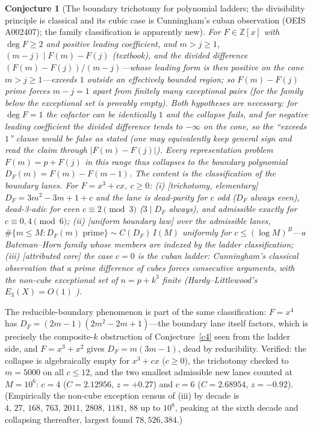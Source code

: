 \documentclass[11pt]{article}
\newtheorem{conjecture}{Conjecture}
\theoremstyle{definition}
\begin{document}
\setcounter{conjecture}{21}%
\begin{conjecture}[The boundary trichotomy for polynomial ladders; the
divisibility principle is classical and its cubic case is
Cunningham's cuban observation (OEIS A002407); the family
classification is apparently new]\label{c13}
For $F\in\mathbb Z[x]$ with $\deg F\ge2$ and \emph{positive leading
coefficient}, and $m>j\ge1$,
$(m-j)\mid F(m)-F(j)$ (textbook), and the divided difference
$(F(m)-F(j))/(m-j)$---whose leading form is then positive on the cone
$m>j\ge1$---exceeds $1$ outside an effectively bounded region; so
$F(m)-F(j)$ prime forces $m-j=1$ apart from finitely many
exceptional pairs (for the family below the exceptional set is
provably \emph{empty}).  Both hypotheses are necessary: for
$\deg F=1$ the cofactor can be identically $1$ and the collapse
fails, and for negative leading coefficient the divided difference
tends to $-\infty$ on the cone, so the ``exceeds $1$'' clause would be
false as stated (one may equivalently keep general sign and read the
claim through $|F(m)-F(j)|$).  Every representation problem $F(m)=p+F(j)$ in
this range
thus collapses to the boundary polynomial $D_F(m)=F(m)-F(m-1)$.  The content
is the classification
of the boundary lanes.  For $F=x^3+cx$, $c\ge0$:
\emph{(i)} [trichotomy, elementary] $D_F=3m^2-3m+1+c$ and the lane is
\emph{dead-parity} for $c$ odd ($D_F$ always even),
\emph{dead-3-adic} for even $c\equiv2\pmod3$ ($3\mid D_F$ always),
and admissible exactly for $c\equiv0,4\pmod6$;
\emph{(ii)} [uniform boundary law] over the admissible lanes,
$\#\{m\le M: D_F(m) \text{ prime}\}\sim C(D_F)\,I(M)$ uniformly for
$c\le(\log M)^B$---a Bateman--Horn family whose members are indexed
by the ladder classification;
\emph{(iii)} [attributed core] the case $c=0$ is the cuban ladder:
Cunningham's classical observation that a prime difference of cubes
forces consecutive arguments, with the non-cube exceptional set of
$n=p+k^3$ finite (Hardy--Littlewood's $E_3(X)=O(1)$ \cite{HL1923}).
\end{conjecture}

The reducible-boundary phenomenon is part of the same
classification: $F=x^4$ has $D_F=(2m-1)(2m^2-2m+1)$---the boundary
lane itself factors, which is precisely the composite-$k$ obstruction
of Conjecture~\ref{c4} seen from the ladder side, and
$F=x^3+x^2$ gives $D_F=m(3m-1)$, dead by reducibility.  Verified:
the collapse is algebraically empty for $x^3+cx$ ($c\ge0$), the
trichotomy checked to $m=5000$ on all $c\le12$, and the two smallest
admissible new lanes counted at $M=10^6$: $c=4$
($C=2.12956$, $z=+0.27$) and $c=6$ ($C=2.68954$, $z=-0.92$).
(Empirically the non-cube exception census of (iii) by decade is
$4,\,27,\,168,\,763,\,2011,\,2808,\,1181,\,88$ up to $10^8$, peaking
at the sixth decade and collapsing thereafter, largest found
$78{,}526{,}384$.)
\end{document}
